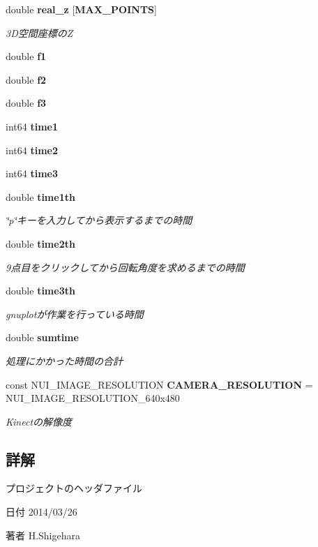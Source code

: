 \begin{DoxyCompactItemize}
double {\bf real\-\_\-z} [{\bf M\-A\-X\-\_\-\-P\-O\-I\-N\-T\-S}]
\begin{DoxyCompactList}\small\item\em 3\-D空間座標の\-Z \end{DoxyCompactList}\item 
double {\bf f1}
\item 
double {\bf f2}
\item 
double {\bf f3}
\item 
int64 {\bf time1}
\item 
int64 {\bf time2}
\item 
int64 {\bf time3}
\item 
double {\bf time1th}
\begin{DoxyCompactList}\small\item\em \char`\"{}p\char`\"{}キーを入力してから表示するまでの時間 \end{DoxyCompactList}\item 
double {\bf time2th}
\begin{DoxyCompactList}\small\item\em 9点目をクリックしてから回転角度を求めるまでの時間 \end{DoxyCompactList}\item 
double {\bf time3th}
\begin{DoxyCompactList}\small\item\em gnuplotが作業を行っている時間 \end{DoxyCompactList}\item 
double {\bf sumtime}
\begin{DoxyCompactList}\small\item\em 処理にかかった時間の合計 \end{DoxyCompactList}\item 
const N\-U\-I\-\_\-\-I\-M\-A\-G\-E\-\_\-\-R\-E\-S\-O\-L\-U\-T\-I\-O\-N {\bf C\-A\-M\-E\-R\-A\-\_\-\-R\-E\-S\-O\-L\-U\-T\-I\-O\-N} = N\-U\-I\-\_\-\-I\-M\-A\-G\-E\-\_\-\-R\-E\-S\-O\-L\-U\-T\-I\-O\-N\-\_\-640x480
\begin{DoxyCompactList}\small\item\em Kinectの解像度 \end{DoxyCompactList}\end{DoxyCompactItemize}


\subsection{詳解}
プロジェクトのヘッダファイル \begin{DoxyDate}{日付}
2014/03/26 
\end{DoxyDate}
\begin{DoxyAuthor}{著者}
H.\-Shigehara 
\end{DoxyAuthor}


